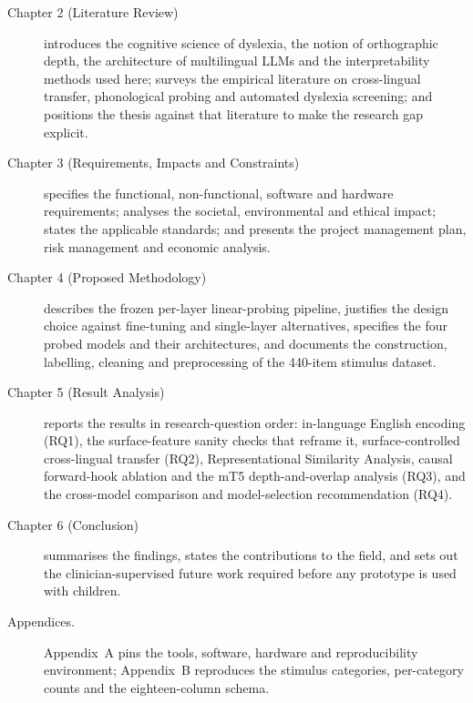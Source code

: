\begin{description}
    \item[Chapter 2 (Literature Review)] introduces the cognitive science of dyslexia, the notion of orthographic depth, the architecture of multilingual LLMs and the interpretability methods used here; surveys the empirical literature on cross-lingual transfer, phonological probing and automated dyslexia screening; and positions the thesis against that literature to make the research gap explicit.
    \item[Chapter 3 (Requirements, Impacts and Constraints)] specifies the functional, non-functional, software and hardware requirements; analyses the societal, environmental and ethical impact; states the applicable standards; and presents the project management plan, risk management and economic analysis.
    \item[Chapter 4 (Proposed Methodology)] describes the frozen per-layer linear-probing pipeline, justifies the design choice against fine-tuning and single-layer alternatives, specifies the four probed models and their architectures, and documents the construction, labelling, cleaning and preprocessing of the 440-item stimulus dataset.
    \item[Chapter 5 (Result Analysis)] reports the results in research-question order: in-language English encoding (RQ1), the surface-feature sanity checks that reframe it, surface-controlled cross-lingual transfer (RQ2), Representational Similarity Analysis, causal forward-hook ablation and the mT5 depth-and-overlap analysis (RQ3), and the cross-model comparison and model-selection recommendation (RQ4).
    \item[Chapter 6 (Conclusion)] summarises the findings, states the contributions to the field, and sets out the clinician-supervised future work required before any prototype is used with children.
    \item[Appendices.] Appendix~A pins the tools, software, hardware and reproducibility environment; Appendix~B reproduces the stimulus categories, per-category counts and the eighteen-column schema.
\end{description}